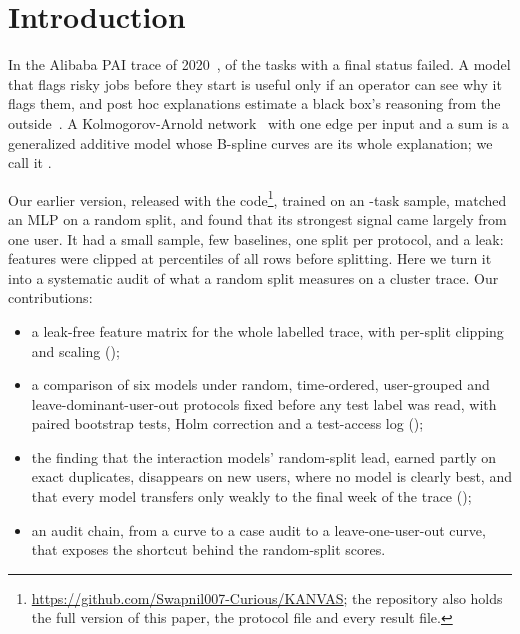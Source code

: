 \section{Introduction}
\label{sec:intro}

In the Alibaba PAI trace of 2020~\cite{weng2022mlaas},  of the  tasks with a final status failed. A model that flags risky jobs before they start is useful only if an operator can see why it flags them, and post hoc explanations estimate a black box's reasoning from the outside~\cite{lundberg2017shap,rudin2019stop}. A Kolmogorov-Arnold network~\cite{liu2025kan} with one edge per input and a sum is a generalized additive model whose B-spline curves are its whole explanation; we call it \kaam{}.

Our earlier version, released with the code\footnote{\url{https://github.com/Swapnil007-Curious/KANVAS}; the repository also holds the full version of this paper, the protocol file and every result file.}, trained \kaam{} on an -task sample, matched an MLP on a random split, and found that its strongest signal came largely from one user. It had a small sample, few baselines, one split per protocol, and a leak: features were clipped at percentiles of all rows before splitting. Here we turn it into a systematic audit of what a random split measures on a cluster trace. Our contributions:
\begin{itemize}
\item a leak-free feature matrix for the whole labelled trace, with per-split clipping and scaling ();
\item a comparison of six models under random, time-ordered, user-grouped and leave-dominant-user-out protocols fixed before any test label was read, with paired bootstrap tests, Holm correction and a test-access log ();
\item the finding that the interaction models' random-split lead, earned partly on exact duplicates, disappears on new users, where no model is clearly best, and that every model transfers only weakly to the final week of the trace ();
\item an audit chain, from a curve to a case audit to a leave-one-user-out curve, that exposes the shortcut behind the random-split scores.
\end{itemize}
